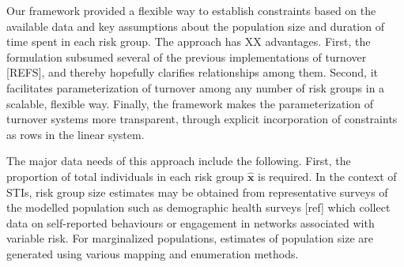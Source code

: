 Our framework %
provided a flexible way to establish constraints based on the available data and
key assumptions about the population size and duration of time spent in each risk group. 
The approach has XX advantages.	%
First, the formulation subsumed several of the previous implementations of turnover [REFS],		%
and thereby hopefully clarifies relationships among them.  %
Second, it facilitates parameterization of turnover among any number of risk groups
in a scalable, flexible way.									%
Finally, the framework makes the parameterization of turnover systems more transparent,
through explicit incorporation of constraints as rows in the linear system.	%

\par %
The major data needs of this approach include the following.			%
First, the proportion of total individuals in each risk group $\bm{\hat{x}}$ is required.	%
In the context of STIs, risk group size estimates may be 
obtained from representative surveys of the modelled population
such as demographic health surveys [ref] which collect data on self-reported behaviours or engagement in %
networks associated with variable risk. For marginalized populations, estimates of population size
are generated using various mapping and enumeration methods. %

